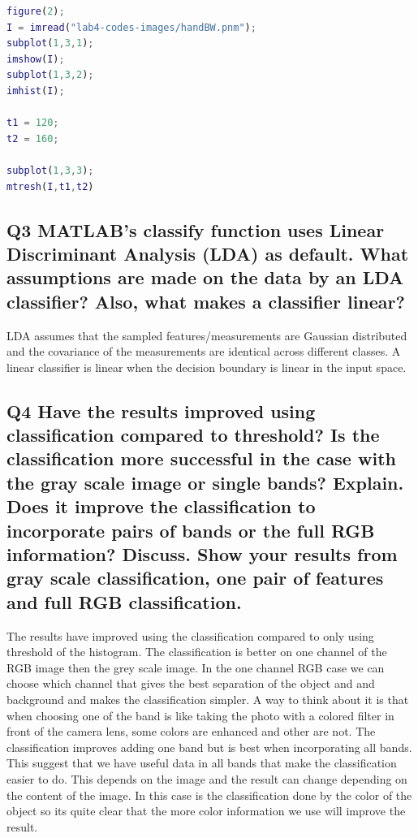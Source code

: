 \documentclass[oneside,a4paper]{article}
\begin{document}
\begin{lstlisting}[language=MATLAB]
figure(2);
I = imread("lab4-codes-images/handBW.pnm");
subplot(1,3,1);  
imshow(I);
subplot(1,3,2);
imhist(I);

t1 = 120;
t2 = 160; 

subplot(1,3,3);
mtresh(I,t1,t2)
\end{lstlisting}

\subsection*{Q3 MATLAB’s classify function uses Linear Discriminant Analysis (LDA) as default. What assumptions are made on the data by an LDA classifier? Also, what makes a classifier linear?}
\noindent LDA assumes that the sampled features/measurements are Gaussian distributed and the covariance of the measurements are identical across different classes. A linear classifier is linear when the decision boundary is linear in the input space. 


\subsection*{Q4 Have the results improved using classification compared to threshold? Is the classification more successful in the case with the gray scale image or single bands? Explain. Does it improve the classification to incorporate pairs of bands or the full RGB information? Discuss. Show your results from gray scale classification, one pair of features and full RGB classification.}
\noindent The results have improved using the classification compared to only using threshold of the histogram. The classification is better on one channel of the RGB image then the grey scale image. In the one channel RGB case we can choose which channel that gives the best separation of the object and and background and makes the classification simpler. A way to think about it is that when choosing one of the band is like taking the photo with a colored filter in front of the camera lens, some colors are enhanced and other are not. The classification improves adding one band but is best when incorporating all bands. This suggest that we have useful data in all bands that make the classification easier to do. This depends on the image and the result can change depending on the content of the image. In this case is the classification done by the color of the object so its quite clear that the more color information we use will improve the result. 
\end{document}
